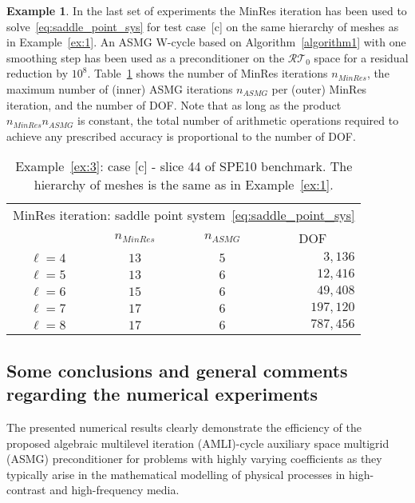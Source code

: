 \documentclass[11pt]{amsart}
\numberwithin{equation}{section}
\theoremstyle{definition}\newtheorem{example}{Example}[section]
\begin{document}
\begin{example}\label{ex:4}
In the last set of experiments the MinRes iteration has been used to 
solve~\eqref{eq:saddle_point_sys} for test case~[c] on the same hierarchy of 
meshes as in Example~\ref{ex:1}. An ASMG W-cycle based on Algorithm~\ref{algorithm1} with
one smoothing step has been used as a preconditioner on the ${{\mathcal{RT}}_{{0}}}$ space for a residual
reduction by $10^8$. Table~\ref{table:c44_saddle_W_m1_m} shows the number of MinRes
iterations $n_{MinRes}$,
the maximum number of (inner) ASMG iterations $n_{ASMG}$ per (outer) MinRes iteration,
and the number of DOF. Note that as long as the product $n_{MinRes}n_{ASMG}$ is constant, 
the total number of arithmetic operations required to achieve any prescribed 
accuracy is proportional to the number of DOF. 
\end{example}
\begin{table}[ht!]
 \begin{center}
 \begin{tabular}{c|ccr}
 \multicolumn {4}{c}{MinRes iteration: saddle point system~\eqref{eq:saddle_point_sys}} \\
 & $n_{MinRes}$ & $n_{ASMG}$ & \multicolumn{1}{c}{DOF}
\\
\hline 
$\ell = 4$ & $13$ & $5$ & $3,136$   
\\
$\ell = 5$ & $13$ & $6$ & $12,416$  
\\
$\ell = 6$ & $15$ & $6$ & $49,408$  
\\
$\ell = 7$ & $17$ & $6$ & $197,120$ 
\\
$\ell = 8$ & $17$ & $6$ & $787,456$ 
\\
\end{tabular} \vspace{2ex}
\caption{Example~\ref{ex:3}: case [c] - slice 44 of SPE10
  benchmark. The hierarchy of meshes is the same as in
  Example~\ref{ex:1}.}\label{table:c44_saddle_W_m1_m}
 \end{center}
\end{table}

\subsection{Some conclusions and general comments regarding the numerical experiments}

The presented numerical results clearly demonstrate the efficiency of the proposed algebraic
multilevel iteration (AMLI)-cycle auxiliary space multigrid (ASMG) preconditioner
for problems with highly varying
coefficients
as they typically arise in the mathematical modelling of physical processes in high-contrast
and high-frequency media. 
\end{document}
